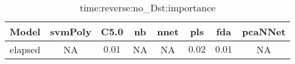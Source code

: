 \begin{table}[!ht]
	\centering
	\begin{tabular}{|c|c|c|c|c|c|c|c|}
		\hline
		Model & svmPoly & C5.0 & nb & nnet & pls & fda & pcaNNet \\ \hline
		elapsed & NA & $0.01$ & NA & NA & $0.02$ & $0.01$ & NA \\ \hline
	\end{tabular}
	\caption{time:reverse:no_Dst:importance}
	\label{tab:time:reverse:no_Dst:importance}
\end{table}
